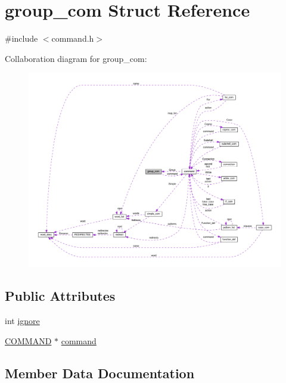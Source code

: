 \hypertarget{structgroup__com}{}\section{group\+\_\+com Struct Reference}
\label{structgroup__com}


{\ttfamily \#include $<$command.\+h$>$}



Collaboration diagram for group\+\_\+com\+:
\nopagebreak
\begin{figure}[H]
\begin{center}
\leavevmode
\includegraphics[width=350pt]{structgroup__com__coll__graph}
\end{center}
\end{figure}
\subsection*{Public Attributes}
\begin{DoxyCompactItemize}
\item 
int \hyperlink{structgroup__com_a3715ce6245659a44296cca565fe8d7d9}{ignore}
\item 
\hyperlink{command_8h_a8c41dec142c299806885773c902c0d87}{C\+O\+M\+M\+A\+ND} $\ast$ \hyperlink{structgroup__com_a89f1f5171979c8f337dae8418adc6d7f}{command}
\end{DoxyCompactItemize}


\subsection{Member Data Documentation}
